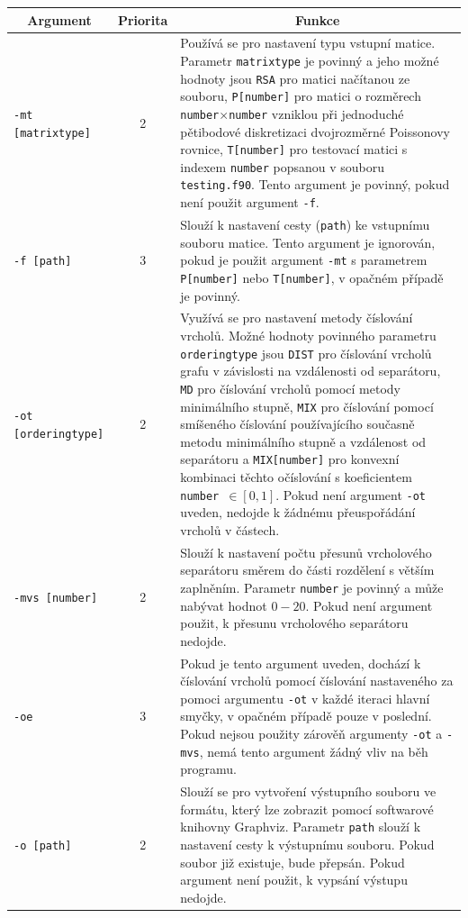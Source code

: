 \documentclass{ctuthesis}
\theoremstyle{plain}
\theoremstyle{definition}
\begin{document}
\bigskip
{\noindent
\footnotesize
  \centering
  \renewcommand{\arraystretch}{1.15}
\begin{tabular}{|l|c|p{8cm}|}
  \hline
  \multicolumn{1}{|c|}{Argument}    & \multicolumn{1}{c|}{Priorita} & \multicolumn{1}{c|}{Funkce} \\
  \hline
  \texttt{-mt [matrixtype]}  & 2 & Používá se pro nastavení typu vstupní matice. Parametr \texttt{matrixtype} je povinný a jeho možné hodnoty jsou \texttt{RSA} pro matici načítanou ze souboru, \texttt{P[number]} pro matici o rozměrech \texttt{number}$\times$\texttt{number} vzniklou při jednoduché pětibodové diskretizaci dvojrozměrné Poissonovy rovnice, \texttt{T[number]} pro testovací matici s indexem \texttt{number} popsanou v souboru \texttt{testing.f90}. Tento argument je povinný, pokud není použit argument \texttt{-f}. \\
  \texttt{-f [path]}& 3 & Slouží k nastavení cesty (\texttt{path}) ke vstupnímu souboru matice. Tento argument je ignorován, pokud je použit argument \texttt{-mt} s parametrem \texttt{P[number]} nebo \texttt{T[number]}, v opačném případě je povinný.\\
  \texttt{-ot [orderingtype]}& 2 & Využívá se pro nastavení metody číslování vrcholů. Možné hodnoty povinného parametru \texttt{orderingtype} jsou \texttt{DIST} pro číslování vrcholů grafu v závislosti na vzdálenosti od separátoru, \texttt{MD} pro číslování vrcholů pomocí metody minimálního stupně, \texttt{MIX} pro číslování pomocí smíšeného číslování používajícího současně metodu minimálního stupně a vzdálenost od separátoru a \texttt{MIX[number]} pro konvexní kombinaci těchto očíslování s koeficientem \texttt{number}~$ \in [0,1]$. Pokud není argument \texttt{-ot} uveden, nedojde k žádnému přeuspořádání vrcholů v částech. \\
  \texttt{-mvs [number]}& 2 & Slouží k nastavení počtu přesunů vrcholového separátoru směrem do části rozdělení s větším zaplněním. Parametr \texttt{number} je povinný a může nabývat hodnot $0 - 20$. Pokud není argument použit, k přesunu vrcholového separátoru nedojde. \\
  \texttt{-oe}& 3 & Pokud je tento argument uveden, dochází k číslování vrcholů pomocí číslování nastaveného za pomoci argumentu \texttt{-ot} v každé iteraci hlavní smyčky, v opačném případě pouze v poslední. Pokud nejsou použity zárověň argumenty \texttt{-ot} a \texttt{-mvs}, nemá tento argument žádný vliv na běh programu.\\
  \texttt{-o [path]}& 2 & Slouží se pro vytvoření výstupního souboru ve formátu, který lze zobrazit pomocí softwarové knihovny Graphviz. Parametr \texttt{path} slouží k nastavení cesty k výstupnímu souboru. Pokud soubor již existuje, bude přepsán. Pokud argument není použit, k vypsání výstupu nedojde.\\

\end{tabular}}
\end{document}
